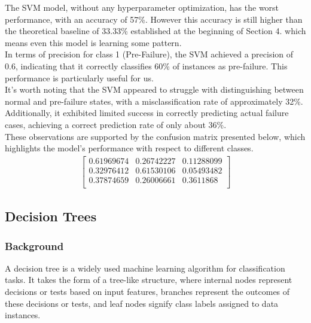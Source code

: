 \documentclass{article}
\begin{document}
The SVM model, without any hyperparameter optimization, has the worst performance, with an accuracy of 57\%. However this accuracy is still higher than the theoretical baseline of 33.33\% established at the beginning of Section 4. which means even this model is learning some pattern.\\

In terms of precision for class 1 (Pre-Failure), the SVM achieved a precision of 0.6, indicating that it correctly classifies 60\% of instances as pre-failure. This performance is particularly useful for us.\\

It's worth noting that the SVM appeared to struggle with distinguishing between normal and pre-failure states, with a misclassification rate of approximately 32\%. Additionally, it exhibited limited success in correctly predicting actual failure cases, achieving a correct prediction rate of only about 36\%.\\

These observations are supported by the confusion matrix presented below, which highlights the model's performance with respect to different classes. \\

\begin{align*}
\begin{bmatrix}
0.61969674 & 0.26742227 & 0.11288099 \\
0.32976412 & 0.61530106 & 0.05493482 \\
0.37874659 & 0.26006661 & 0.3611868 \\
\end{bmatrix}
\end{align*}

\subsection{Decision Trees}
\subsubsection{Background}

A decision tree is a widely used machine learning algorithm for classification tasks. It takes the form of a tree-like structure, where internal nodes represent decisions or tests based on input features, branches represent the outcomes of these decisions or tests, and leaf nodes signify class labels assigned to data instances.\\
\end{document}
